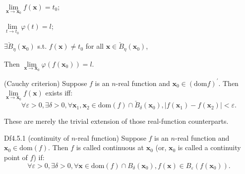 \documentclass{article}
\begin{document}
\begin{Rmk}{}
{\begin{compactenum}
        \begin{compactenum}
            \item $\lim\limits_{\pmb{x}\to\pmb{x}_0} f(\pmb{x}) = t_0$;
            \item $\lim\limits_{t\to t_0} \varphi(t) = l$;
            \item $\exists \check{B}_\eta(\pmb{x}_0)$ s.t. $f(\pmb{x})\neq t_0$ for all $\pmb{x}\in\check{B}_\eta(\pmb{x}_0)$,
        \end{compactenum}
        Then $\lim\limits_{\pmb{x}\to\pmb{x}_0} \varphi(f(\pmb{x}_0)) = l$.
        \item (Cauchy criterion) Suppose $f$ is an $n$-real function and $\pmb{x}_0\in(\text{dom}{f})^\prime$. Then $\lim\limits_{\pmb{x}\to\pmb{x}_0} f(\pmb{x})$ exists iff:
        $$\forall \varepsilon>0, \exists \delta>0, \forall \pmb{x}_1, \pmb{x}_2\in\text{dom}(f)\cap \check{B}_\delta(\pmb{x}_0), |f(\pmb{x}_1)-f(\pmb{x}_2)|<\varepsilon.$$
    \end{compactenum}}
    These are merely the trivial extension of those real-function counterparts.
\end{Rmk}

\begin{Df}{Df4.5.1 (continuity of $n$-real function)}
    Suppose $f$ is an $n$-real function and $\pmb{x}_0\in\text{dom}(f)$. Then $f$ is called continuous at $\pmb{x}_0$ (or, $\pmb{x}_0$ is called a continuity point of $f$) if:
    $$\forall\varepsilon>0, \exists\delta>0, \forall \pmb{x}\in\text{dom}(f)\cap B_\delta(\pmb{x}_0), f(\pmb{x})\in B_\varepsilon(f(\pmb{x}_0)).$$
\end{Df}
\end{document}
